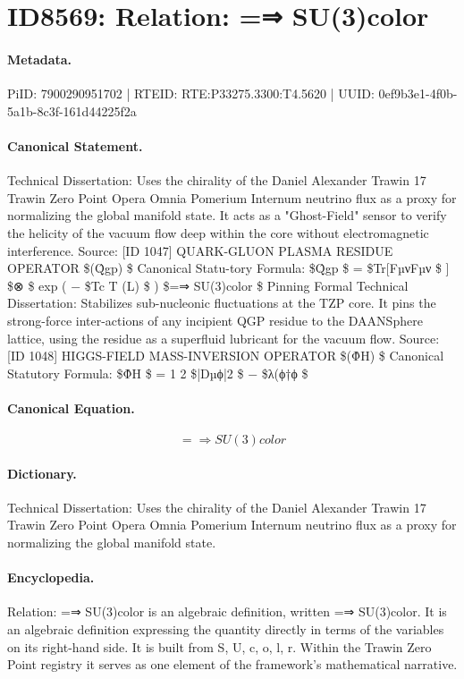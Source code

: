 \section*{ID8569: Relation: =⇒ SU(3)color}
\paragraph{Metadata.}
PiID: 7900290951702 | RTEID: RTE:P33275.3300:T4.5620 | UUID: 0ef9b3e1-4f0b-5a1b-8c3f-161d44225f2a

\paragraph{Canonical Statement.}
Technical Dissertation: Uses the chirality of the Daniel Alexander Trawin 17 Trawin Zero Point Opera Omnia Pomerium Internum neutrino flux as a proxy for normalizing the global manifold state. It acts as a "Ghost-Field" sensor to verify the helicity of the vacuum flow deep within the core without electromagnetic interference. Source: [ID 1047] QUARK-GLUON PLASMA RESIDUE OPERATOR \$(Q̂gp) \$ Canonical Statu-tory Formula: \$Q̂gp \$ = \$Tr[FµνFµν \$ ] \$⊗ \$ exp ( − \$Tc T (L) \$ ) \$=⇒ SU(3)color \$ Pinning Formal Technical Dissertation: Stabilizes sub-nucleonic fluctuations at the TZP core. It pins the strong-force inter-actions of any incipient QGP residue to the DAANSphere lattice, using the residue as a superfluid lubricant for the vacuum flow. Source: [ID 1048] HIGGS-FIELD MASS-INVERSION OPERATOR \$(Φ̂H) \$ Canonical Statutory Formula: \$Φ̂H \$ = 1 2 \$|Dµϕ|2 \$ − \$λ(ϕ†ϕ \$

\paragraph{Canonical Equation.}
\[
=⇒ SU(3)color
\]

\paragraph{Dictionary.}
Technical Dissertation: Uses the chirality of the Daniel Alexander Trawin 17 Trawin Zero Point Opera Omnia Pomerium Internum neutrino flux as a proxy for normalizing the global manifold state.

\paragraph{Encyclopedia.}
Relation: =⇒ SU(3)color is an algebraic definition, written =⇒ SU(3)color. It is an algebraic definition expressing the quantity directly in terms of the variables on its right-hand side. It is built from S, U, c, o, l, r. Within the Trawin Zero Point registry it serves as one element of the framework's mathematical narrative.
